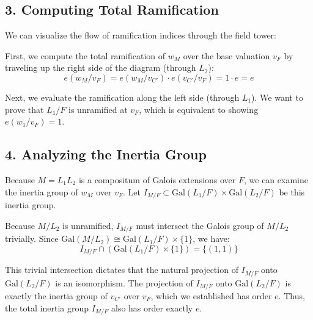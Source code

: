 \subsection*{3. Computing Total Ramification}

We can visualize the flow of ramification indices through the field tower:

\vspace{1em}
\begin{center}
\end{center}
\vspace{1em}

First, we compute the total ramification of $w_M$ over the base valuation $v_F$ by traveling up the right side of the diagram (through $L_2$):
\[
e(w_M / v_F) = e(w_M / v_{C'}) \cdot e(v_{C'} / v_F) = 1 \cdot e = e
\]

Next, we evaluate the ramification along the left side (through $L_1$). We want to prove that $L_1/F$ is unramified at $v_F$, which is equivalent to showing $e(w_1 / v_F) = 1$.

\subsection*{4. Analyzing the Inertia Group}

Because $M = L_1 L_2$ is a compositum of Galois extensions over $F$, we can examine the inertia group of $w_M$ over $v_F$. Let $I_{M/F} \subset \text{Gal}(L_1/F) \times \text{Gal}(L_2/F)$ be this inertia group. 

Because $M/L_2$ is unramified, $I_{M/F}$ must intersect the Galois group of $M/L_2$ trivially. Since $\text{Gal}(M/L_2) \cong \text{Gal}(L_1/F) \times \{1\}$, we have:
\[
I_{M/F} \cap (\text{Gal}(L_1/F) \times \{1\}) = \{(1, 1)\}
\]

This trivial intersection dictates that the natural projection of $I_{M/F}$ onto $\text{Gal}(L_2/F)$ is an isomorphism. The projection of $I_{M/F}$ onto $\text{Gal}(L_2/F)$ is exactly the inertia group of $v_{C'}$ over $v_F$, which we established has order $e$. Thus, the total inertia group $I_{M/F}$ also has order exactly $e$.

